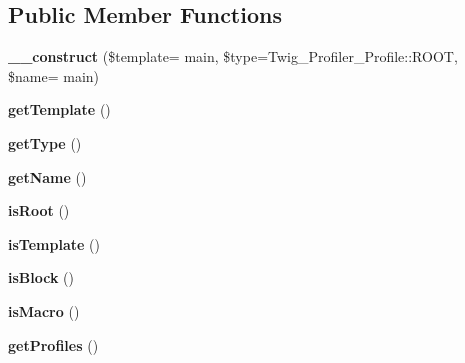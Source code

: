 \subsection*{Public Member Functions}
\begin{DoxyCompactItemize}
\item 
\hypertarget{class_twig___profiler___profile_ac0a6251459f5864dd99fc1737c44a409}{}{\bfseries \+\_\+\+\_\+construct} (\$template= \textquotesingle{}main\textquotesingle{}, \$type=Twig\+\_\+\+Profiler\+\_\+\+Profile\+::\+R\+O\+O\+T, \$name= \textquotesingle{}main\textquotesingle{})\label{class_twig___profiler___profile_ac0a6251459f5864dd99fc1737c44a409}

\item 
\hypertarget{class_twig___profiler___profile_a5d9dc4ee2d6563ea86a5d8f4d450d124}{}{\bfseries get\+Template} ()\label{class_twig___profiler___profile_a5d9dc4ee2d6563ea86a5d8f4d450d124}

\item 
\hypertarget{class_twig___profiler___profile_a830b5c75df72b32396701bc563fbe3c7}{}{\bfseries get\+Type} ()\label{class_twig___profiler___profile_a830b5c75df72b32396701bc563fbe3c7}

\item 
\hypertarget{class_twig___profiler___profile_a3d0963e68bb313b163a73f2803c64600}{}{\bfseries get\+Name} ()\label{class_twig___profiler___profile_a3d0963e68bb313b163a73f2803c64600}

\item 
\hypertarget{class_twig___profiler___profile_a846a3636e0fd9960ac164258af6d3552}{}{\bfseries is\+Root} ()\label{class_twig___profiler___profile_a846a3636e0fd9960ac164258af6d3552}

\item 
\hypertarget{class_twig___profiler___profile_a965825ba500d5526200b008e4f5f3029}{}{\bfseries is\+Template} ()\label{class_twig___profiler___profile_a965825ba500d5526200b008e4f5f3029}

\item 
\hypertarget{class_twig___profiler___profile_a8d8566f1bbdbb0cad606c303f07c062f}{}{\bfseries is\+Block} ()\label{class_twig___profiler___profile_a8d8566f1bbdbb0cad606c303f07c062f}

\item 
\hypertarget{class_twig___profiler___profile_afed616c177c7b39421fd84ecbc2659a0}{}{\bfseries is\+Macro} ()\label{class_twig___profiler___profile_afed616c177c7b39421fd84ecbc2659a0}

\item 
\hypertarget{class_twig___profiler___profile_a927651326409d58d7f147af4f68615bd}{}{\bfseries get\+Profiles} ()\label{class_twig___profiler___profile_a927651326409d58d7f147af4f68615bd}


\end{DoxyCompactItemize}
